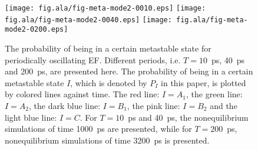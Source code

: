 \documentclass[a4paper,preprint,unsortedaddress,onecolumn]{revtex4-1}
\begin{document}
\begin{figure}
  \centering
  \texttt{[image: fig.ala/fig-meta-mode2-0010.eps]}
  \texttt{[image: fig.ala/fig-meta-mode2-0040.eps]}
  \texttt{[image: fig.ala/fig-meta-mode2-0200.eps]}
  \caption{ The probability of being in a certain metastable state for
    periodically oscillating EF. Different periods,
    i.e. $T=10$~ps, 40~ps and 200~ps, are presented here.  The
    probability of being in a certain metastable state $I$, which is
    denoted by $P_I$ in this paper, is plotted by colored lines against
    time. The red line: $I = A_1$, the green line: $I = A_2$, the dark
    blue line: $I = B_1$, the pink line: $I = B_2$ and the light blue
    line: $I = C$. For $T=10$~ps and 40~ps, the nonequilibrium
    simulations of time 1000~ps are presented, while for $T=200$~ps,
    nonequilibrium simulations of time 3200~ps is presented.  }
  \label{fig:tmp9}
\end{figure}
\end{document}
